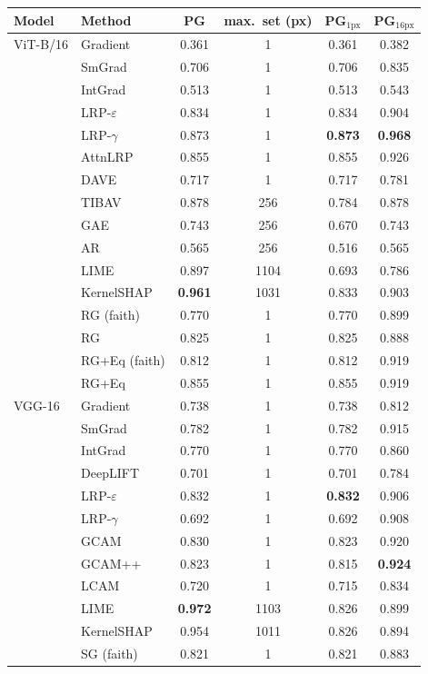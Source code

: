 \begin{tabular}{@{}l l c c c c@{}}
\toprule
Model & Method & PG & max.\ set (px) & PG$_{1\mathrm{px}}$ & PG$_{16\mathrm{px}}$ \\
\midrule
ViT-B/16 & Gradient & 0.361 & 1 & 0.361 & 0.382 \\
 & SmGrad & 0.706 & 1 & 0.706 & 0.835 \\
 & IntGrad & 0.513 & 1 & 0.513 & 0.543 \\
 & LRP-$\varepsilon$ & 0.834 & 1 & 0.834 & 0.904 \\
 & LRP-$\gamma$ & 0.873 & 1 & \textbf{0.873} & \textbf{0.968} \\
 & AttnLRP & 0.855 & 1 & 0.855 & 0.926 \\
 & DAVE & 0.717 & 1 & 0.717 & 0.781 \\
 & TIBAV & 0.878 & 256 & 0.784 & 0.878 \\
 & GAE & 0.743 & 256 & 0.670 & 0.743 \\
 & AR & 0.565 & 256 & 0.516 & 0.565 \\
 & LIME & 0.897 & 1104 & 0.693 & 0.786 \\
 & KernelSHAP & \textbf{0.961} & 1031 & 0.833 & 0.903 \\
 & RG (faith) & 0.770 & 1 & 0.770 & 0.899 \\
 & RG & 0.825 & 1 & 0.825 & 0.888 \\
 & RG+Eq (faith) & 0.812 & 1 & 0.812 & 0.919 \\
 & RG+Eq & 0.855 & 1 & 0.855 & 0.919 \\
\midrule
VGG-16 & Gradient & 0.738 & 1 & 0.738 & 0.812 \\
 & SmGrad & 0.782 & 1 & 0.782 & 0.915 \\
 & IntGrad & 0.770 & 1 & 0.770 & 0.860 \\
 & DeepLIFT & 0.701 & 1 & 0.701 & 0.784 \\
 & LRP-$\varepsilon$ & 0.832 & 1 & \textbf{0.832} & 0.906 \\
 & LRP-$\gamma$ & 0.692 & 1 & 0.692 & 0.908 \\
 & GCAM & 0.830 & 1 & 0.823 & 0.920 \\
 & GCAM++ & 0.823 & 1 & 0.815 & \textbf{0.924} \\
 & LCAM & 0.720 & 1 & 0.715 & 0.834 \\
 & LIME & \textbf{0.972} & 1103 & 0.826 & 0.899 \\
 & KernelSHAP & 0.954 & 1011 & 0.826 & 0.894 \\
 & SG (faith) & 0.821 & 1 & 0.821 & 0.883 \\

\end{tabular}
